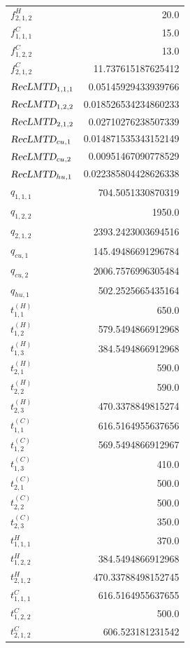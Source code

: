 \documentclass{article}%
\begin{document}
\begin{multicols*}{3}
\begin{supertabular}{lr}
	$f_{2,1,2}^{H}$ & 20.0 \\%
	$f_{1,1,1}^{C}$ & 15.0 \\%
	$f_{1,2,2}^{C}$ & 13.0 \\%
	$f_{2,1,2}^{C}$ & 11.737615187625412 \\%
	$\textsl{RecLMTD}_{1,1,1}$ & 0.05145929433939766 \\%
	$\textsl{RecLMTD}_{1,2,2}$ & 0.018526534234860233 \\%
	$\textsl{RecLMTD}_{2,1,2}$ & 0.02710276238507339 \\%
	$\textsl{RecLMTD}_{cu,1}$ & 0.014871535343152149 \\%
	$\textsl{RecLMTD}_{cu,2}$ & 0.00951467090778529 \\%
	$\textsl{RecLMTD}_{hu,1}$ & 0.022385804428626338 \\%
	$q_{1,1,1}$ & 704.5051330870319 \\%
	$q_{1,2,2}$ & 1950.0 \\%
	$q_{2,1,2}$ & 2393.2423003694516 \\%
	$q_{cu,1}$ & 145.49486691296784 \\%
	$q_{cu,2}$ & 2006.7576996305484 \\%
	$q_{hu,1}$ & 502.2525665435164 \\%
	$t_{1,1}^{(H)}$ & 650.0 \\%
	$t_{1,2}^{(H)}$ & 579.5494866912968 \\%
	$t_{1,3}^{(H)}$ & 384.5494866912968 \\%
	$t_{2,1}^{(H)}$ & 590.0 \\%
	$t_{2,2}^{(H)}$ & 590.0 \\%
	$t_{2,3}^{(H)}$ & 470.3378849815274 \\%
	$t_{1,1}^{(C)}$ & 616.5164955637656 \\%
	$t_{1,2}^{(C)}$ & 569.5494866912967 \\%
	$t_{1,3}^{(C)}$ & 410.0 \\%
	$t_{2,1}^{(C)}$ & 500.0 \\%
	$t_{2,2}^{(C)}$ & 500.0 \\%
	$t_{2,3}^{(C)}$ & 350.0 \\%
	$t_{1,1,1}^{H}$ & 370.0 \\%
	$t_{1,2,2}^{H}$ & 384.5494866912968 \\%
	$t_{2,1,2}^{H}$ & 470.33788498152745 \\%
	$t_{1,1,1}^{C}$ & 616.5164955637655 \\%
	$t_{1,2,2}^{C}$ & 500.0 \\%
	$t_{2,1,2}^{C}$ & 606.523181231542 \\%

\end{supertabular}
\end{multicols*}
\end{document}
